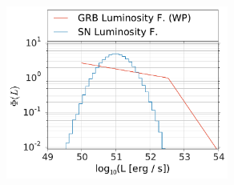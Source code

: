 \begin{figure}
 \centering
\includegraphics[width=0.65\textwidth]{fig/Lpeak_wp_SN.pdf}
\caption{}
\label{fig:lum_SN}
\end{figure}



% 